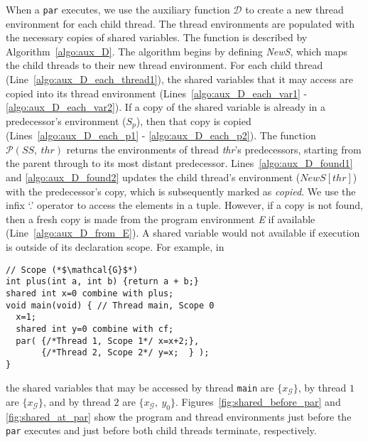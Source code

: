 When a \verb$par$ executes, we use the auxiliary function $\mathcal{D}$ 
to create a new thread environment for each child thread. The thread 
environments are populated with the necessary copies of shared variables. 
The function is described by Algorithm~\ref{algo:aux_D}. The algorithm 
begins by defining \emph{NewS}, which maps the child threads to their 
new thread environment. 
For each child thread (Line~\ref{algo:aux_D_each_thread1}), 
the shared variables that it may access are copied into its thread environment
(Lines~\ref{algo:aux_D_each_var1} - \ref{algo:aux_D_each_var2}). 
If a copy of the shared variable is already in a predecessor's environment 
($S_p$), then that copy is copied (Lines~\ref{algo:aux_D_each_p1} - 
\ref{algo:aux_D_each_p2}). The function $\mathcal{P}(SS,~thr)$ returns the 
environments of thread \emph{thr}'s predecessors, starting from the 
parent through to its most distant predecessor. Lines~\ref{algo:aux_D_found1} and 
\ref{algo:aux_D_found2} updates the child thread's environment ($NewS[thr]$) 
with the predecessor's copy, which is subsequently marked as \emph{copied}. 
We use the infix `.' operator to access the elements in a tuple.
However, if a copy is not found, then a fresh 
copy is made from the program environment \emph{E} if available (Line~\ref{algo:aux_D_from_E}). 
A shared variable would not available if 
execution is outside of its declaration scope. For example, in
\begin{lstlisting}[style=snippet]
// Scope (*$\mathcal{G}$*)
int plus(int a, int b) {return a + b;}
shared int x=0 combine with plus;
void main(void) { // Thread main, Scope 0
  x=1;
  shared int y=0 combine with cf;
  par( {/*Thread 1, Scope 1*/ x=x+2;}, 
       {/*Thread 2, Scope 2*/ y=x;  } );
}
\end{lstlisting}
the shared variables that may be accessed by thread \verb$main$ are 
$\{x_\mathcal{G}\}$, by thread $1$ are $\{x_\mathcal{G}\}$, and by 
thread $2$ are $\{x_\mathcal{G},~y_0\}$. Figures~\ref{fig:shared_before_par}
and \ref{fig:shared_at_par} show the program and thread environments
just before the \verb$par$ executes and just before both child threads terminate, 
respectively. 

